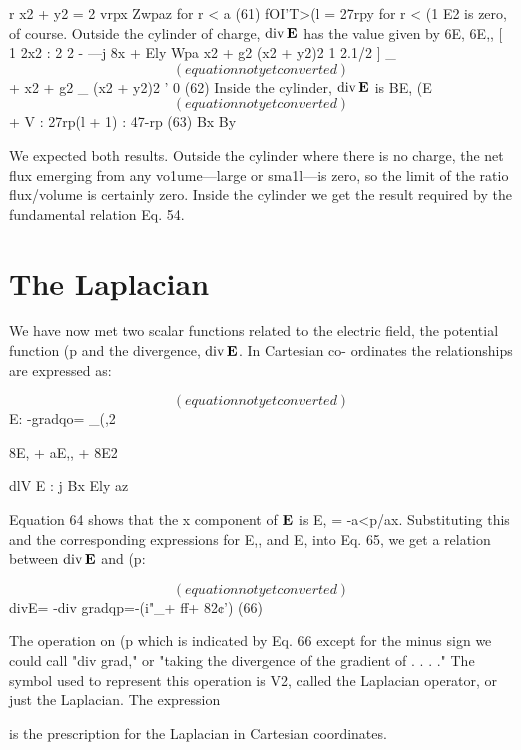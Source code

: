 r x2 + y2
= 2
vrpx Zwpaz for r < a (61)
 fOI'T>(l
= 27rpy for r < (1
E2 is zero, of course.
Outside the cylinder of charge, $\operatorname{div}\mathbf{E}$ has the value given by
6E, 6E,, [ 1 2x2
: 2 2 - ---j
8x + Ely Wpa x2 + g2 (x2 + y2)2
1 2.1/2 ] _
\begin{equation}
(equation not yet converted)
\end{equation}
+ x2 + g2 _ (x2 + y2)2 ' 0 (62)
Inside the cylinder, $\operatorname{div}\mathbf{E}$ is
BE, (E
\begin{equation}
(equation not yet converted)
\end{equation}
+ V : 27rp(l + 1) : 47-rp (63)
Bx By

We expected both results. Outside the cylinder where there is no
charge, the net flux emerging from any vo1ume---large or sma1l---is
zero, so the limit of the ratio flux/volume is certainly zero. Inside the
cylinder we get the result required by the fundamental relation Eq. 54.

\section{The Laplacian}

We have now met two scalar functions related to the electric field,
the potential function (p and the divergence, $\operatorname{div}\mathbf{E}$. In Cartesian co-
ordinates the relationships are expressed as:

\begin{equation}
(equation not yet converted)
\end{equation}
E: -gradqo= _(,2%

8E, + aE,, + 8E2

dlV E : j
Bx Ely az

Equation 64 shows that the x component of $\mathbf{E}$ is E, = -a<p/ax.
Substituting this and the corresponding expressions for E,, and E,
into Eq. 65, we get a relation between $\operatorname{div}\mathbf{E}$ and (p:

\begin{equation}
(equation not yet converted)
\end{equation}
divE= -div gradqp=-(i"_+ ff+ 82¢') (66)

The operation on (p which is indicated by Eq. 66 except for the minus
sign we could call "div grad," or "taking the divergence of the
gradient of . . . ." The symbol used to represent this operation is V2,
called the Laplacian operator, or just the Laplacian. The expression

is the prescription for the Laplacian in Cartesian coordinates.

